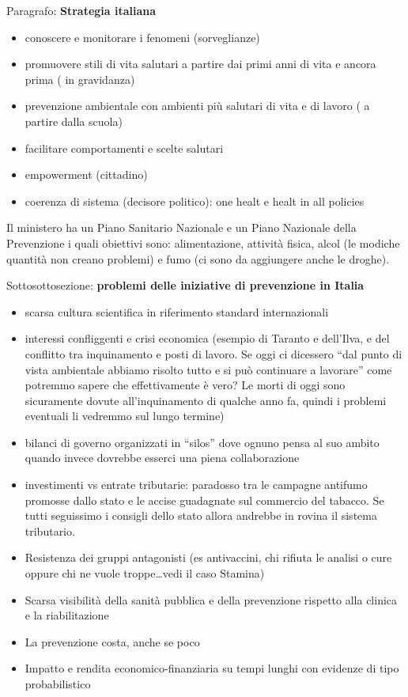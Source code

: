 \documentclass[]{article}
\begin{document}
Paragrafo: \textbf{Strategia italiana}

\begin{itemize}
\item
  conoscere e monitorare i fenomeni (sorveglianze)
\item
  promuovere stili di vita salutari a partire dai primi anni di vita e
  ancora prima ( in gravidanza)
\item
  prevenzione ambientale con ambienti più salutari di vita e di lavoro (
  a partire dalla scuola)
\item
  facilitare comportamenti e scelte salutari
\item
  empowerment (cittadino)
\item
  coerenza di sistema (decisore politico): one healt e healt in all
  policies
\end{itemize}

Il ministero ha un Piano Sanitario Nazionale e un Piano Nazionale della
Prevenzione i quali obiettivi sono: alimentazione, attività fisica,
alcol (le modiche quantità non creano problemi) e fumo (ci sono da
aggiungere anche le droghe).

Sottosottosezione: \textbf{problemi delle iniziative di prevenzione in
Italia}

\begin{itemize}
\item
  scarsa cultura scientifica in riferimento standard internazionali
\item
  interessi confliggenti e crisi economica (esempio di Taranto e
  dell'Ilva, e del conflitto tra inquinamento e posti di lavoro. Se oggi
  ci dicessero ``dal punto di vista ambientale abbiamo risolto tutto e
  si può continuare a lavorare'' come potremmo sapere che effettivamente
  è vero? Le morti di oggi sono sicuramente dovute all'inquinamento di
  qualche anno fa, quindi i problemi eventuali li vedremmo sul lungo
  termine)
\item
  bilanci di governo organizzati in ``silos'' dove ognuno pensa al suo
  ambito quando invece dovrebbe esserci una piena collaborazione
\item
  investimenti vs entrate tributarie: paradosso tra le campagne antifumo
  promosse dallo stato e le accise guadagnate sul commercio del tabacco.
  Se tutti seguissimo i consigli dello stato allora andrebbe in rovina
  il sistema tributario.
\item
  Resistenza dei gruppi antagonisti (es antivaccini, chi rifiuta le
  analisi o cure oppure chi ne vuole troppe\ldots{}vedi il caso Stamina)
\item
  Scarsa visibilità della sanità pubblica e della prevenzione rispetto
  alla clinica e la riabilitazione
\item
  La prevenzione costa, anche se poco
\item
  Impatto e rendita economico-finanziaria su tempi lunghi con evidenze
  di tipo probabilistico
\end{itemize}
\end{document}
